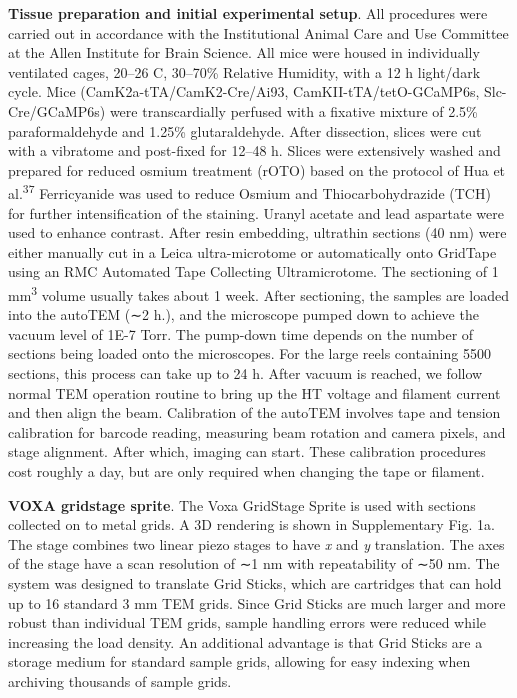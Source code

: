 \documentclass{article}
\begin{document}
{\small
\noindent\textbf{Tissue preparation and initial experimental setup}. All procedures were carried out in accordance with the Institutional Animal Care and Use Committee at the Allen Institute for Brain Science. All mice were housed in individually ventilated cages, 20–26 C, 30–70\% Relative Humidity, with a 12 h light/dark cycle. Mice (CamK2a-tTA/CamK2-Cre/Ai93, CamKII-tTA/tetO-GCaMP6s, Slc-Cre/GCaMP6s) were transcardially perfused with a fixative mixture of 2.5\% paraformaldehyde and 1.25\% glutaraldehyde. After dissection, slices were cut with a vibratome and post-fixed for 12–48 h. Slices were extensively washed and prepared for reduced osmium treatment (rOTO) based on the protocol of Hua et al.\textsuperscript{37} Ferricyanide was used to reduce Osmium and Thiocarbohydrazide (TCH) for further intensification of the staining. Uranyl acetate and lead aspartate were used to enhance contrast. After resin embedding, ultrathin sections (40 nm) were either manually cut in a Leica ultra-microtome or automatically onto GridTape using an RMC Automated Tape Collecting Ultramicrotome. The sectioning of 1 mm\textsuperscript{3} volume usually takes about 1 week. After sectioning, the samples are loaded into the autoTEM (∼2 h.), and the microscope pumped down to achieve the vacuum level of 1E-7 Torr. The pump-down time depends on the number of sections being loaded onto the microscopes. For the large reels containing 5500 sections, this process can take up to 24 h. After vacuum is reached, we follow normal TEM operation routine to bring up the HT voltage and filament current and then align the beam. Calibration of the autoTEM involves tape and tension calibration for barcode reading, measuring beam rotation and camera pixels, and stage alignment. After which, imaging can start. These calibration procedures cost roughly a day, but are only required when changing the tape or filament.

\noindent\textbf{VOXA gridstage sprite}. The Voxa GridStage Sprite is used with sections collected on to metal grids. A 3D rendering is shown in Supplementary Fig. 1a. The stage combines two linear piezo stages to have \emph{x} and \emph{y} translation. The axes of the stage have a scan resolution of ∼1 nm with repeatability of ∼50 nm. The system was designed to translate Grid Sticks, which are cartridges that can hold up to 16 standard 3 mm TEM grids. Since Grid Sticks are much larger and more robust than individual TEM grids, sample handling errors were reduced while increasing the load density. An additional advantage is that Grid Sticks are a storage medium for standard sample grids, allowing for easy indexing when archiving thousands of sample grids.

}
\end{document}
